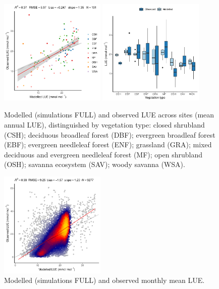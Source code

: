\documentclass{myreport}
\begin{document}
 \begin{figure}[!ht]
\includegraphics[width=0.45\textwidth]{fig/modobs_lue_bysite_classid.pdf}
\includegraphics[width=0.45\textwidth]{fig/boxplot_lue_bysite_classid.pdf}
    \caption{Modelled (simulations FULL) and observed LUE across sites (mean annual LUE), distinguished by vegetation type: closed shrubland (CSH); deciduous broadleaf forest (DBF); evergreen broadleaf forest (EBF); evergreen needleleaf forest (ENF); grassland (GRA); mixed deciduous and evergreen needleleaf forest (MF); open shrubland (OSH); savanna ecosystem (SAV); woody savanna (WSA). }
    \label{fig:lue_spatial}
\end{figure}

 \begin{figure}[!ht]
\includegraphics[width=0.45\textwidth]{fig/modobs_lue_monthly.pdf}
    \caption{Modelled (simulations FULL) and observed monthly mean LUE.}
    \label{fig:lue_monthly}
\end{figure}
\end{document}
